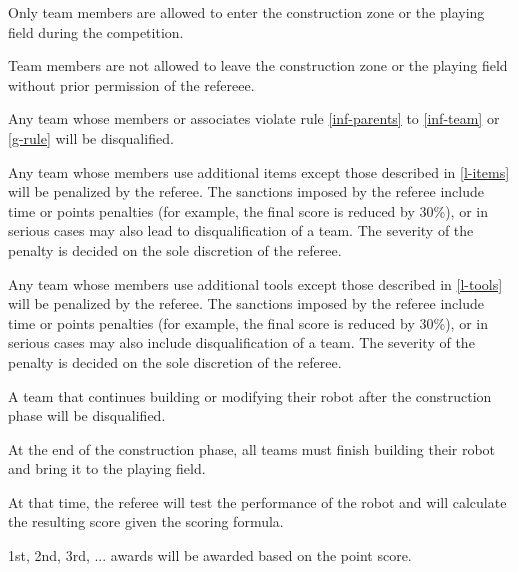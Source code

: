 \documentclass[12pt]{hurocup}
\begin{document}
\begin{lawlist}[JC]

\item \label{inf-parents} Only team members are allowed to enter the
  construction zone or the playing field during the competition.

\item \label{inf-team} Team members are not allowed to leave the
  construction zone or the playing field without prior permission of
  the refereee.

\item Any team whose members or associates violate rule
  \ref{inf-parents} to \ref{inf-team} or \ref{g-rule} will be
  disqualified.

\item Any team whose members use additional items except those
  described in \ref{l-items} will be penalized by the referee. The
  sanctions imposed by the referee include time or points penalties
  (for example, the final score is reduced by 30\%), or in serious
  cases may also lead to disqualification of a team. The severity of
  the penalty is decided on the sole discretion of the referee.

\item Any team whose members use additional tools except those
  described in \ref{l-tools} will be penalized by the referee. The
  sanctions imposed by the referee include time or points penalties
  (for example, the final score is reduced by 30\%), or in serious
  cases may also include disqualification of a team. The severity of
  the penalty is decided on the sole discretion of the referee.

\item A team that continues building or modifying their robot after
  the construction phase will be disqualified.

\end{lawlist}


\begin{lawlist}[JC]

\item At the end of the construction phase, all teams must finish
  building their robot and bring it to the playing field. 

\item At that time, the referee will test the performance of the robot
  and will calculate the resulting score given the scoring formula.

\item 1st, 2nd, 3rd, ... awards will be awarded based on the point
  score. 

\end{lawlist}
\end{document}
